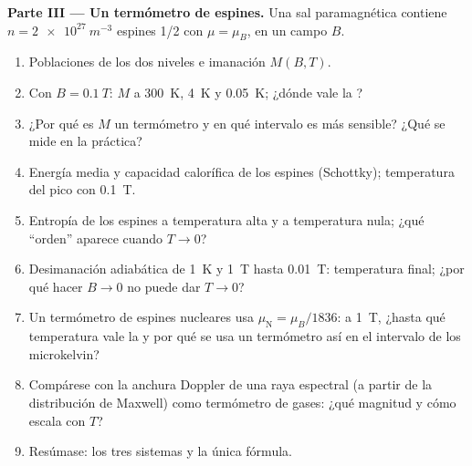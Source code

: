 \begin{problem}
\textbf{Parte III --- Un termómetro de espines.}
Una sal paramagnética contiene $n = \qty{2e27}{m^{-3}}$ espines 1/2 con $\mu
= \mu_B$, en un campo $B$.
\begin{enumerate}[resume]
  \item Poblaciones de los dos niveles e imanación
        $M(B,T)$.
  \item Con $B = \qty{0.1}{T}$: $M$ a \qty{300}{K}, \qty{4}{K} y \qty{0.05}{K};
        ¿dónde vale la ?
  \item ¿Por qué es $M$ un termómetro y en qué intervalo es más
        sensible? ¿Qué se mide en la práctica?
  \item Energía media y capacidad calorífica de los espines (Schottky);
        temperatura del pico con \qty{0.1}{T}.
  \item Entropía de los espines a temperatura alta y a temperatura nula; ¿qué
        ``orden'' aparece cuando $T \to 0$?
  \item Desimanación adiabática de \qty{1}{K} y \qty{1}{T} hasta \qty{0.01}{T}:
        temperatura final; ¿por qué hacer $B \to 0$ no puede dar $T \to 0$?
  \item Un termómetro de espines nucleares usa $\mu_{\text{N}} = \mu_B/1836$: a
        \qty{1}{T}, ¿hasta qué temperatura vale la  y
        por qué se usa un termómetro así en el intervalo de los microkelvin?
  \item Compárese con la anchura Doppler de una raya espectral (a partir de la
        distribución de Maxwell) como termómetro de gases: ¿qué magnitud y
        cómo escala con $T$?
  \item Resúmase: los tres sistemas y la única fórmula.
\end{enumerate}
\end{problem}
